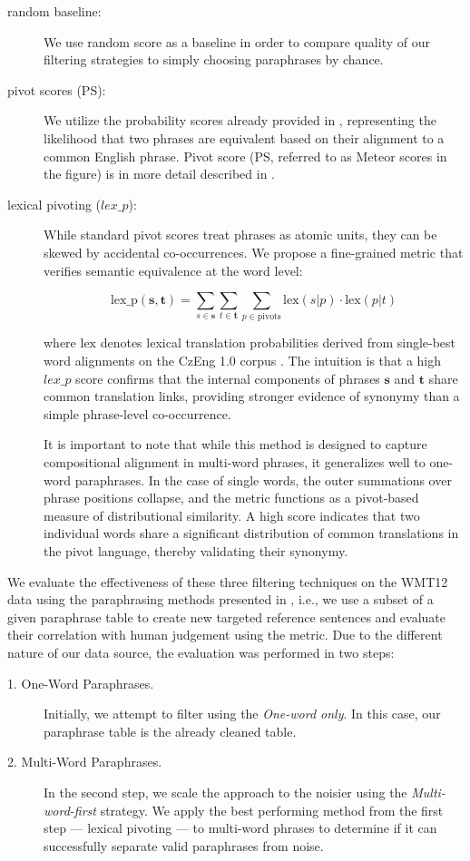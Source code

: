 \begin{description}
\item[random baseline:] We use random score as a baseline in order to compare quality of our filtering strategies to simply choosing paraphrases by chance.

\item[pivot scores (PS):] We utilize the probability scores already provided in \cmpt, representing the likelihood that two phrases are equivalent based on their alignment to a common English phrase. Pivot score (PS, referred to as Meteor scores in the figure)  is in more detail described in .

\item[lexical pivoting ($lex\_p$):] While standard pivot scores treat phrases as atomic units, they can be skewed by accidental co-occurrences. We propose a fine-grained metric that verifies semantic equivalence at the word level:

\[ \text{lex\_p}(\mathbf{s},\mathbf{t}) = \sum_{s \in \mathbf{s}}\sum_{t \in \mathbf{t}}\sum_{p \in \text{pivots}}\text{lex}(s|p) \cdot \text{lex}(p|t) \]

where $\text{lex}$ denotes lexical translation probabilities derived from single-best word alignments on the CzEng 1.0 corpus \citep{czeng10:lrec2012}. The intuition is that a high $lex\_p$ score confirms that the internal components of phrases $\mathbf{s}$ and $\mathbf{t}$ share common translation links, providing stronger evidence of synonymy than a simple phrase-level co-occurrence. 

It is important to note that while this method is designed to capture compositional alignment in multi-word phrases, it generalizes well to one-word paraphrases. In the case of single words, the outer summations over phrase positions collapse, and the metric functions as a pivot-based measure of distributional similarity. A high score indicates that two individual words share a significant distribution of common translations in the pivot language, thereby validating their synonymy. 
\end{description}

We evaluate the effectiveness of these three filtering techniques on the WMT12 data using the paraphrasing methods presented in , i.e., we use a subset of a given paraphrase table to create new targeted reference sentences and evaluate their correlation with human judgement using the \bleu metric. Due to the different nature of our data source, the evaluation was performed in two steps:
\begin{description}
    \item[1. One-Word Paraphrases.] Initially, we attempt to filter using the \emph{One-word only}. In this case, our paraphrase table is the already cleaned \fm table.
    \item[2. Multi-Word Paraphrases.]  In the second step, we scale the approach to the noisier \cmpt using the \emph{Multi-word-first} strategy. We apply the best performing method from the first step --- lexical pivoting --- to multi-word phrases to determine if it can successfully separate valid paraphrases from noise.
\end{description}

